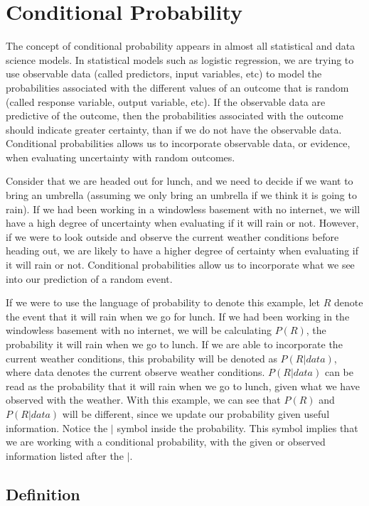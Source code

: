 \documentclass[
]{book}
\begin{document}
\section{Conditional Probability}\label{conditional-probability}

The concept of conditional probability appears in almost all statistical and data science models. In statistical models such as logistic regression, we are trying to use observable data (called predictors, input variables, etc) to model the probabilities associated with the different values of an outcome that is random (called response variable, output variable, etc). If the observable data are predictive of the outcome, then the probabilities associated with the outcome should indicate greater certainty, than if we do not have the observable data. Conditional probabilities allows us to incorporate observable data, or evidence, when evaluating uncertainty with random outcomes.

Consider that we are headed out for lunch, and we need to decide if we want to bring an umbrella (assuming we only bring an umbrella if we think it is going to rain). If we had been working in a windowless basement with no internet, we will have a high degree of uncertainty when evaluating if it will rain or not. However, if we were to look outside and observe the current weather conditions before heading out, we are likely to have a higher degree of certainty when evaluating if it will rain or not. Conditional probabilities allow us to incorporate what we see into our prediction of a random event.

If we were to use the language of probability to denote this example, let \(R\) denote the event that it will rain when we go for lunch. If we had been working in the windowless basement with no internet, we will be calculating \(P(R)\), the probability it will rain when we go to lunch. If we are able to incorporate the current weather conditions, this probability will be denoted as \(P(R|data)\), where data denotes the current observe weather conditions. \(P(R|data)\) can be read as the probability that it will rain when we go to lunch, given what we have observed with the weather. With this example, we can see that \(P(R)\) and \(P(R|data)\) will be different, since we update our probability given useful information. Notice the \(|\) symbol inside the probability. This symbol implies that we are working with a conditional probability, with the given or observed information listed after the \(|\).

\subsection{Definition}\label{def}
\end{document}
